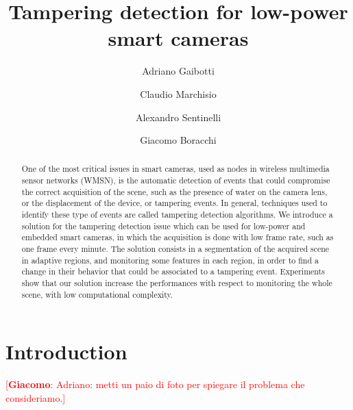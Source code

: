 \documentclass{llncs}
\newcommand{\gi}[1]{{\textcolor{red}{[\small \textbf{Giacomo}: #1]}}}
\begin{document}
\title{Tampering detection for low-power smart cameras}

\author{Adriano Gaibotti \and Claudio Marchisio \and Alexandro Sentinelli \and Giacomo Boracchi}

\maketitle

\begin{abstract}
One of the most critical issues in smart cameras, used as nodes in wireless multimedia sensor networks (WMSN), is the automatic detection of events that could compromise the correct acquisition of the scene, such as the presence of water on the camera lens, or the displacement of the device, or tampering events. 
In general, techniques used to identify these type of events are called tampering detection algorithms.
We introduce a solution for the tampering detection issue which can be used for low-power and embedded smart cameras, in which the acquisition is done with low frame rate, such as one frame every minute.
The solution consists in a segmentation of the acquired scene in adaptive regions, and monitoring some features in each region, in order to find a change in their behavior that could be associated to a tampering event.
Experiments show that our solution increase the performances with respect to monitoring the whole scene, with low computational complexity.
\end{abstract}



\section{Introduction}\label{sec:introduction}

\gi{Adriano: metti un paio di foto per spiegare il problema che consideriamo.}
\end{document}

